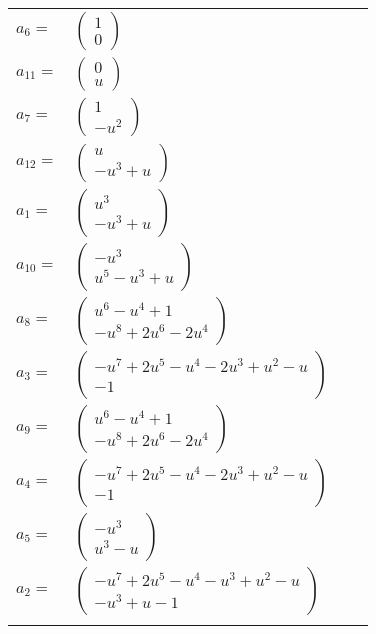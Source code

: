 \documentclass[1p]{elsarticle_modified}
\theoremstyle{definition}
\begin{document}
\begin{tabular}{m{7pt} m{180pt} m{7pt} m{180pt} }
\flushright $a_{6}=$&$\begin{pmatrix}1\\0\end{pmatrix}$ \\
\flushright $a_{11}=$&$\begin{pmatrix}0\\u\end{pmatrix}$ \\
\flushright $a_{7}=$&$\begin{pmatrix}1\\- u^2\end{pmatrix}$ \\
\flushright $a_{12}=$&$\begin{pmatrix}u\\- u^3+u\end{pmatrix}$ \\
\flushright $a_{1}=$&$\begin{pmatrix}u^3\\- u^3+u\end{pmatrix}$ \\
\flushright $a_{10}=$&$\begin{pmatrix}- u^3\\u^5- u^3+u\end{pmatrix}$ \\
\flushright $a_{8}=$&$\begin{pmatrix}u^6- u^4+1\\- u^8+2 u^6-2 u^4\end{pmatrix}$ \\
\flushright $a_{3}=$&$\begin{pmatrix}- u^7+2 u^5- u^4-2 u^3+u^2- u\\-1\end{pmatrix}$ \\
\flushright $a_{9}=$&$\begin{pmatrix}u^6- u^4+1\\- u^8+2 u^6-2 u^4\end{pmatrix}$ \\
\flushright $a_{4}=$&$\begin{pmatrix}- u^7+2 u^5- u^4-2 u^3+u^2- u\\-1\end{pmatrix}$ \\
\flushright $a_{5}=$&$\begin{pmatrix}- u^3\\u^3- u\end{pmatrix}$ \\
\flushright $a_{2}=$&$\begin{pmatrix}- u^7+2 u^5- u^4- u^3+u^2- u\\- u^3+u-1\end{pmatrix}$\\&\end{tabular}
\end{document}
